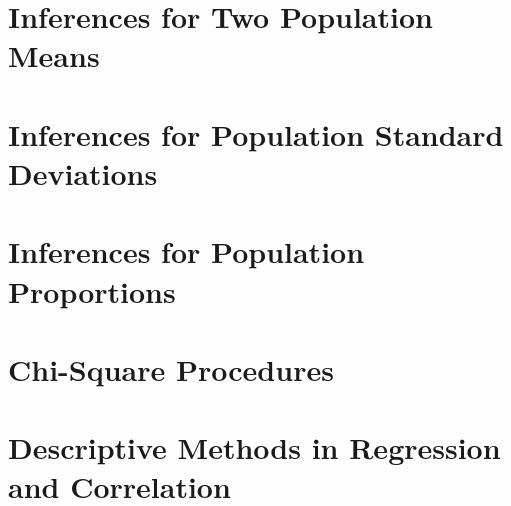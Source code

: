 \documentclass{article}\usepackage[]{graphicx}\usepackage[]{color}
\begin{document}
\section{Inferences for Two Population Means}
\section{Inferences for Population Standard Deviations}
\section{Inferences for Population Proportions}
\section{Chi-Square Procedures}
\section{Descriptive Methods in Regression and Correlation}

\end{document}
